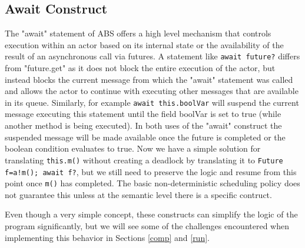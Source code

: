





\subsection{Await Construct}
The "await" statement of ABS offers a high level mechanism that controls execution within an actor based on its internal state or the availability of the result of an asynchronous call via futures. A statement like \lstinline|await future?| differs from "future.get" as it does not block the entire execution of the actor, but instead blocks the current message from which the "await" statement was called and allows the actor to continue with executing other messages that are available in its queue. Similarly, for example \lstinline|await this.boolVar| will suspend the current message executing this statement until the field boolVar is set to true (while another method is being executed). In both uses of the "await" construct the suspended message will be made available once the future is completed or the boolean condition evaluates to true. Now we have a simple solution for translating \lstinline|this.m()| without creating a deadlock by translating it to \lstinline|Future f=a!m(); await f?|, but we still need to preserve the logic and resume from this point once \lstinline|m()| has completed. The basic non-deterministic scheduling policy does not guarantee this unless at the semantic level there is a specific contruct\cite{creol,resume}. 

Even though a very simple concept, these constructs can simplify the logic of the program significantly, but we will see some of the challenges encountered when implementing this behavior in Sections \ref{comp} and \ref{run}.        

